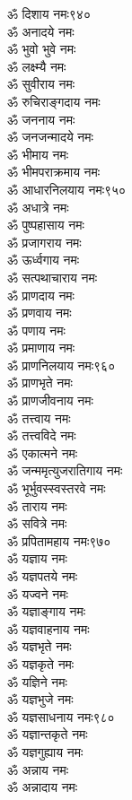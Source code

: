 \begin{multicols}{2}
\begin{flushleft}
ॐ दिशाय नमः\hfill ९४०\\
ॐ अनादये नमः\\
ॐ भुवो भुवे नमः\\
ॐ लक्ष्म्यै नमः\\
ॐ सुवीराय नमः\\
ॐ रुचिराङ्गदाय नमः\\
ॐ जननाय नमः\\
ॐ जनजन्मादये नमः\\
ॐ भीमाय नमः\\
ॐ भीमपराक्रमाय नमः\\
ॐ आधारनिलयाय नमः\hfill ९५०\\
ॐ अधात्रे नमः\\
ॐ पुष्पहासाय नमः\\
ॐ प्रजागराय नमः\\
ॐ ऊर्ध्वगाय नमः\\
ॐ सत्पथाचाराय नमः\\
ॐ प्राणदाय नमः\\
ॐ प्रणवाय नमः\\
ॐ पणाय नमः\\
ॐ प्रमाणाय नमः\\
ॐ प्राणनिलयाय नमः\hfill ९६०\\
ॐ प्राणभृते नमः\\
ॐ प्राणजीवनाय नमः\\
ॐ तत्त्वाय नमः\\
ॐ तत्त्वविदे नमः\\
ॐ एकात्मने नमः\\
ॐ जन्ममृत्युजरातिगाय नमः\\
ॐ भूर्भुवस्स्वस्तरवे नमः\\
ॐ ताराय नमः\\
ॐ सवित्रे नमः\\
ॐ प्रपितामहाय नमः\hfill ९७०\\
ॐ यज्ञाय नमः\\
ॐ यज्ञपतये नमः\\
ॐ यज्वने नमः\\
ॐ यज्ञाङ्गाय नमः\\
ॐ यज्ञवाहनाय नमः\\
ॐ यज्ञभृते नमः\\
ॐ यज्ञकृते नमः\\
ॐ यज्ञिने नमः\\
ॐ यज्ञभुजे नमः\\
ॐ यज्ञसाधनाय नमः\hfill ९८०\\
ॐ यज्ञान्तकृते नमः\\
ॐ यज्ञगुह्याय नमः\\
ॐ अन्नाय नमः\\
ॐ अन्नादाय नमः\\

\end{flushleft}
\end{multicols}
